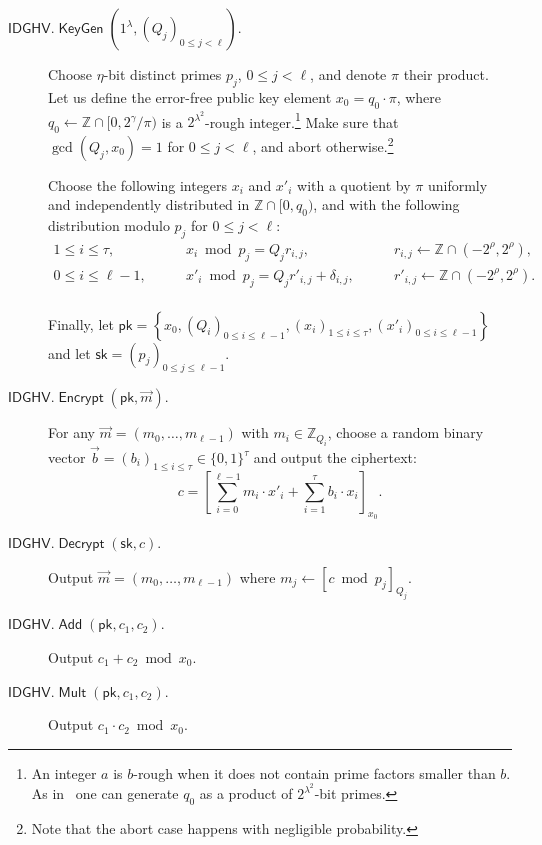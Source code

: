 \documentclass{llncs}
\renewcommand\leq\leqslant
\newcommand{\Z}{{\mathbb Z}}
\DeclareMathOperator{\KeyGen}{\ensuremath{\mathsf{KeyGen}}}
\DeclareMathOperator{\Encrypt}{\ensuremath{\mathsf{Encrypt}}}
\DeclareMathOperator{\Decrypt}{\ensuremath{\mathsf{Decrypt}}}
\DeclareMathOperator{\Add}{\ensuremath{\mathsf{Add}}}
\DeclareMathOperator{\Mult}{\ensuremath{\mathsf{Mult}}}
\newcommand*{\pk}{\ensuremath{\mathsf{pk}}}
\newcommand*{\sk}{\ensuremath{\mathsf{sk}}}
\newcommand*{\CDGHV}{\ensuremath{\mathsf{IDGHV}}}
\begin{document}
\begin{description}\label{CDGHV}
\item[$\CDGHV.\KeyGen(1^\lambda,(Q_j)_{0\leq j <\ell})$.] Choose $\eta$-bit distinct primes $p_j$, $0\leq j<\ell$, and denote $\pi$
their product. Let us define the error-free public key element
$x_0=q_0\cdot\pi$, where $q_0 \gets \Z \cap [0,2^{\gamma}/\pi)$
  is a $2^{\lambda^2}$-rough integer.\footnote{An integer $a$ is $b$-rough when it does
    not contain prime factors smaller than $b$. As in~\cite{CMNT2011} one can
    generate $q_0$ as a product of $2^{\lambda^2}$-bit primes.}  
  Make sure that $\gcd(Q_j,x_0)=1$ for $0\leq j<\ell$, and abort
  otherwise.\footnote{Note that the abort case happens with negligible
    probability.}
  
  Choose the following integers $x_i$ and $x'_i$ with a quotient by $\pi$ uniformly
  and independently distributed in $\Z\cap [0, q_0)$, and with the
    following distribution modulo $p_j$ for $0 \leq j < \ell$:
$$
\begin{array}{lll}
1 \leq i \leq \tau, & \qquad x_i\bmod p_j = Q_j r_{i,j},& \qquad r_{i,j}
\gets\Z\cap(-2^{\rho}, 2^{\rho}), \\[.2cm]

0\leq i\leq \ell-1, & \qquad x'_i\bmod p_j = Q_jr'_{i,j}+\delta_{i,j}, &
\qquad r'_{i,j}\gets\Z\cap(-2^{\rho}, 2^{\rho}). \\[.2cm]

\end{array}
$$

Finally, let $\pk = \left\{ x_0, \left(Q_i\right)_{0\leq i \leq
  \ell-1},\left(x_i\right)_{1\leq i\leq \tau},\left(x'_i\right)_{0\leq i\leq \ell-1}\right\}$ 
and let $\sk=(p_j)_{0\leq j\leq {\ell-1}}$.
\\\vspace{-0.25cm}
\item[$\CDGHV.\Encrypt(\pk, {\vec{m}})$.] For any
  $\vec{m}=(m_0,\dots,m_{\ell-1})$ with $m_i\in\Z_{Q_i}$, choose a
  random binary vector $\vec{b}=(b_i)_{1\leq i \leq \tau}\in
  \{0,1\}^\tau$ and output the ciphertext:
\begin{equation}
\label{eq:enccdghv}
c = \left[\sum\limits_{i=0}^{\ell-1} m_i \cdot x'_i + 
	\sum_{i=1}^\tau 
b_i\cdot x_i\right]_{x_0}.
\end{equation}
\item[$\CDGHV.\Decrypt(\sk, c)$.] Output $\vec{m}=(m_0,\ldots,m_{\ell-1})$ where $m_j \gets [c\bmod{p_j}]_{Q_j}$.
\\\vspace{-0.25cm}
\item[$\CDGHV.\Add(\pk, c_1, c_2)$.] Output $c_1+c_2 \bmod x_0$.
\\\vspace{-0.25cm}
\item[$\CDGHV.\Mult(\pk, c_1, c_2)$.] Output $c_1 \cdot c_2 \bmod x_0$.
\end{description}
\end{document}
